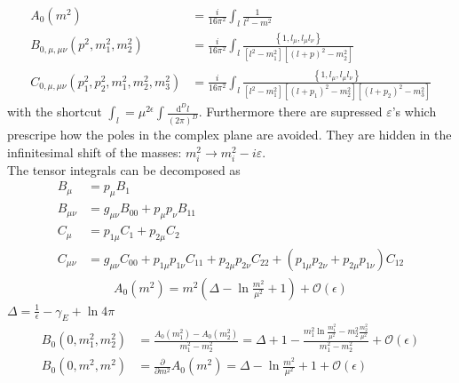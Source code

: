 \begin{align}
A_0(m^2) &= \frac{i}{16\pi^2} \int_l \frac{1}{l^2-m^2}\nonumber\\
B_{0,\mu,\mu\nu}(p^2,m_1^2,m_2^2) &= \frac{i}{16\pi^2} \int_l \frac{\left\{1,l_\mu,l_\mu l_\nu \right\}}{[l^2-m_1^2][(l+p)^2-m_2^2]}\nonumber\\
C_{0,\mu,\mu\nu}(p_1^2,p_2^2,m_1^2,m_2^2,m_3^2) &= \frac{i}{16\pi^2} \int_l \frac{\left\{1,l_\mu,l_\mu l_\nu \right\}}{[l^2-m_1^2][(l+p_1)^2-m_2^2][(l+p_2)^2-m_3^2]}
\end{align}
with the shortcut $\int_l = \mu^{2\epsilon}\int\frac{\mathrm{d}^D l}{(2\pi)^D}$. Furthermore there are supressed $\varepsilon$'s which prescripe how the poles in the complex plane are avoided. They are hidden in the infinitesimal shift of the masses: $m_i^2 \to m_i^2 - i \varepsilon$.\\
The tensor integrals can be decomposed as
\begin{align}
B_\mu &= p_\mu B_1\nonumber\\
B_{\mu\nu} &= g_{\mu\nu}B_{00} + p_\mu p_\nu B_{11}\nonumber\\
C_\mu &= p_{1\mu}C_1 + p_{2\mu}C_2 \nonumber\\
C_{\mu\nu} &= g_{\mu\nu}C_{00} + p_{1\mu}p_{1\nu}C_{11} + p_{2\mu}p_{2\nu}C_{22} + (p_{1\mu}p_{2\nu} + p_{2\mu}p_{1\nu})C_{12} 
\end{align}
\begin{align}
A_0(m^2) = m^2\left( \Delta -\ln \frac{m^2}{\mu^2} + 1 \right) + \mathcal{O}(\epsilon)
\end{align}
$\Delta = \frac{1}{\epsilon} - \gamma_E+\ln 4\pi$
\begin{align}
B_0(0,m_1^2,m_2^2) &= \frac{A_0(m_1^2)-A_0(m_2^2)}{m_1^2-m_2^2} = \Delta + 1 -\frac{m_1^2\ln \frac{m_1^2}{\mu^2}-m_2^2\frac{m_2^2}{\mu^2}}{m_1^2-m_2^2} + \mathcal{O}(\epsilon)\\
B_0(0,m^2,m^2) &= \frac{\partial}{\partial m^2} A_0(m^2) = \Delta -\ln \frac{m^2}{\mu^2} + 1 + \mathcal{O}(\epsilon)
\end{align}


